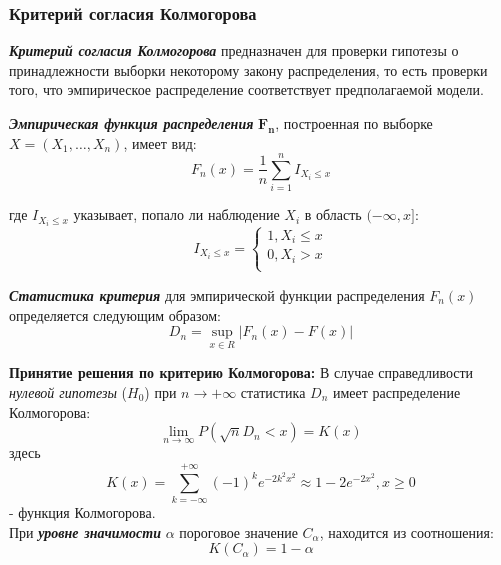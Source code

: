 \subsubsection{Критерий согласия Колмогорова}
\textbf{\textit{Критерий согласия Колмогорова}} предназначен для проверки гипотезы о принадлежности выборки некоторому закону распределения, то есть проверки того, что эмпирическое распределение соответствует предполагаемой модели.

\textbf{\textit{Эмпирическая функция распределения}} $\mathbf{F_{n}}$, построенная по выборке $X = (X_{1}, \ldots, X_{n})$, имеет вид:
\begin{equation}
	F_{n}(x) = \frac{1}{n} \sum_{i=1}^{n}I_{X_{i} \leqslant x}
\end{equation}

где $I_{X_{i} \leqslant x}$ указывает, попало ли наблюдение $X_{i}$ в область $(-\infty, x]$:
\begin{equation}
	I_{X_{i} \leqslant x} =
	\begin{cases}{}
		1, X_{i} \leqslant x \\
		0, X_{i} > x         \\
	\end{cases}
\end{equation}

\textbf{\textit{Статистика критерия}} для эмпирической функции распределения $F_{n}(x)$ определяется следующим образом:
\begin{equation}
	D_{n} = \sup_{x \in R} |F_{n}(x) - F(x)|
\end{equation}

\textbf{Принятие решения по критерию Колмогорова:}
В случае справедливости \textit{нулевой гипотезы} ($H_{0}$) при $n \rightarrow + \infty$ статистика $D_{n}$ имеет распределение Колмогорова:
\begin{equation}
	\lim_{n \rightarrow \infty} P(\sqrt{n} D_{n} < x) = K(x)
\end{equation}
здесь
\begin{equation}
	K(x) = \sum_{k = -\infty}^{+\infty} (-1)^{k} e^{-2k^{2}x^{2}} \approx 1 - 2e^{-2x^{2}}, x \geqslant 0
	\label{kolmogorov_distribution_function}
\end{equation}
- функция Колмогорова.\\

При \textbf{\textit{уровне значимости}} $\alpha$ пороговое значение $C_{\alpha}$, находится из соотношения:
\begin{equation}
	K(C_{\alpha}) = 1 - \alpha
	\label{threshold_value}
\end{equation}

